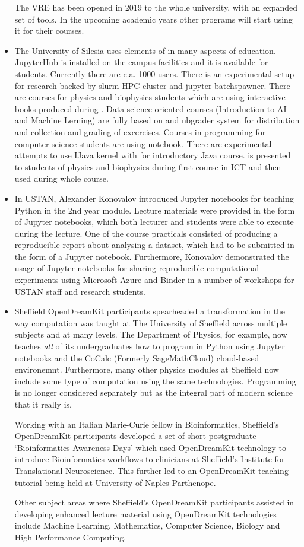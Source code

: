 \documentclass{deliverablereport}
\begin{document}
\begin{itemize}
  The VRE has been opened in 2019 to the whole university, with an
  expanded set of tools. In the upcoming academic years other programs
  will start using it for their courses.
\item
  The University of Silesia uses elements of \ODK in many aspects of
  education. JupyterHub is installed on the campus facilities and it
  is available for students. Currently there are c.a. 1000
  users. There is an experimental setup for research backed by slurm
  HPC cluster and jupyter-batchspawner. There are courses for physics
  and biophysics students which are using interactive books produced
  during \ODK. Data science oriented courses (Introduction to AI and
  Machine Lerning) are fully based on \Jupyter and nbgrader system for
  distribution and collection and grading of excercises. Courses in
  \Python programming for computer science students are using \Jupyter
  notebook. There are experimental attempts to use IJava kernel with
  \Jupyter for introductory Java course. \SageMath is presented to
  students of physics and biophysics during first course in ICT and
  then used during whole course. 
\item
  In USTAN, Alexander Konovalov introduced Jupyter notebooks
  for teaching Python in the 2nd year module. Lecture materials 
  were provided in the form of Jupyter notebooks, which both lecturer
  and students were able to execute during the lecture. One of the
  course practicals consisted of producing a reproducible report
  about analysing a dataset, which had to be submitted in the form
  of a Jupyter notebook. Furthermore, Konovalov demonstrated the usage
  of Jupyter notebooks for sharing reproducible computational 
  experiments using Microsoft Azure and Binder in a number of 
  workshops for USTAN staff and research students.
\item
  Sheffield OpenDreamKit participants spearheaded a transformation in
  the way computation was taught at The University of Sheffield across
  multiple subjects and at many levels. The Department of Physics, for
  example, now teaches \emph{all} of its undergraduates how to program
  in Python using Jupyter notebooks and the CoCalc (Formerly
  SageMathCloud) cloud-based environemnt. Furthermore, many other
  physics modules at Sheffield now include some type of computation
  using the same technologies. Programming is no longer considered
  separately but as the integral part of modern science that it really
  is.

  Working with an Italian Marie-Curie fellow in Bioinformatics,
  Sheffield's OpenDreamKit participants developed a set of short
  postgraduate `Bioinformatics Awareness Days' which used OpenDreamKit
  technology to introduce Bioinformatics workflows to clinicians at
  Sheffield's Institute for Translational Neuroscience. This further led
  to an OpenDreamKit teaching tutorial being held at University of
  Naples Parthenope.

  Other subject areas where Sheffield's OpenDreamKit participants
  assisted in developing enhanced lecture material using OpenDreamKit
  technologies include Machine Learning, Mathematics, Computer Science,
  Biology and High Performance Computing.
\end{itemize}
\end{document}
